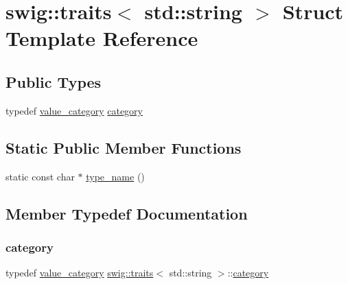 \hypertarget{structswig_1_1traits_3_01std_1_1string_01_4}{}\section{swig\+:\+:traits$<$ std\+:\+:string $>$ Struct Template Reference}
\label{structswig_1_1traits_3_01std_1_1string_01_4}
\subsection*{Public Types}
\begin{DoxyCompactItemize}
\item 
typedef \hyperlink{structswig_1_1value__category}{value\+\_\+category} \hyperlink{structswig_1_1traits_3_01std_1_1string_01_4_aec31e973b1220342e0b89c6b8fe96684}{category}
\end{DoxyCompactItemize}
\subsection*{Static Public Member Functions}
\begin{DoxyCompactItemize}
\item 
static const char $\ast$ \hyperlink{structswig_1_1traits_3_01std_1_1string_01_4_ab4142e71b21ccbad9a8161a116f660d2}{type\+\_\+name} ()
\end{DoxyCompactItemize}


\subsection{Member Typedef Documentation}
\mbox{\label{structswig_1_1traits_3_01std_1_1string_01_4_aec31e973b1220342e0b89c6b8fe96684}} 
\subsubsection{\texorpdfstring{category}{category}}
{\footnotesize\ttfamily typedef \hyperlink{structswig_1_1value__category}{value\+\_\+category} \hyperlink{structswig_1_1traits}{swig\+::traits}$<$ std\+::string $>$\+::\hyperlink{structswig_1_1traits_3_01std_1_1string_01_4_aec31e973b1220342e0b89c6b8fe96684}{category}}



